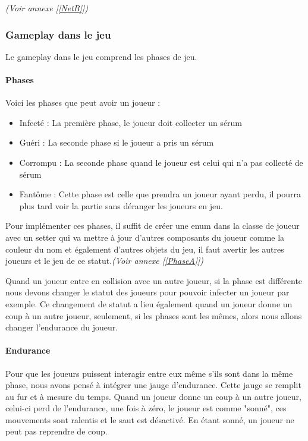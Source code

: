 \documentclass{article}
\begin{document}
\emph{(Voir annexe [\ref{NetB}])}

\newpage
\subsubsection{Gameplay dans le jeu}

Le gameplay dans le jeu comprend les phases de jeu.

\paragraph{Phases}

Voici les phases que peut avoir un joueur :

\begin{itemize}
\item Infecté : La première phase, le joueur doit collecter un sérum

\item Guéri : La seconde phase si le joueur a pris un sérum

\item Corrompu : La seconde phase quand le joueur est celui qui n'a pas collecté de sérum

\item Fantôme : Cette phase est celle que prendra un joueur ayant perdu, il pourra plus tard voir la partie sans déranger les joueurs en jeu.
\end{itemize}

Pour implémenter ces phases, il suffit de créer une enum dans la classe de joueur avec un setter qui va mettre à jour d'autres composants du joueur comme la couleur du nom et également d'autres objets du jeu, il faut avertir les autres joueurs et le jeu de ce statut.\emph{(Voir annexe [\ref{PhaseA}])}

Quand un joueur entre en collision avec un autre joueur, si la phase est différente nous devons changer le statut des joueurs pour pouvoir infecter un joueur par exemple. Ce changement de statut a lieu également quand un joueur donne un coup à un autre joueur, seulement, si les phases sont les mêmes, alors nous allons changer l'endurance du joueur.

\paragraph{Endurance}

Pour que les joueurs puissent interagir entre eux même s'ils sont dans la même phase, nous avons pensé à intégrer une jauge d'endurance. Cette jauge se remplit au fur et à mesure du temps. Quand un joueur donne un coup à un autre joueur, celui-ci perd de l'endurance, une fois à zéro, le joueur est comme "sonné", ces mouvements sont ralentis et le saut est désactivé. En étant sonné, un joueur ne peut pas reprendre de coup.
\end{document}
